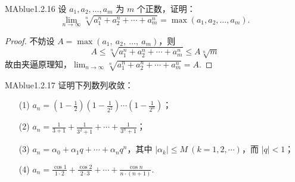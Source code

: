 \begin{problem}{MAblue}{1.2.16}
    设 $a_1, a_2, \ldots, a_m$ 为 $m$ 个正数，证明：
    \[
        \lim_{n \to \infty} \sqrt[n]{a_1^n + a_2^n + \cdots + a_m^n} = \max(a_1, a_2, \ldots, a_m).
    \]
\end{problem}

\begin{proof}
    不妨设 $A = \max( a_1,\ a_2,\ \ldots,\ a_m)$，则
    \[
        A \leqslant \sqrt[n]{a_1^n+a_2^n+\cdots+a_m^n} \leqslant A \sqrt[n] m
    \]
    故由夹逼原理知，$\lim_{n \to \infty} \sqrt[n]{a_1^n+a_2^n+\cdots+a_m^n} = A$.
\end{proof}

\begin{problem}{MAblue}{1.2.17}
    证明下列数列收敛：
    \begin{enumerate}
        \item[(1)]
        $a_n = \left( 1 - \frac 1 2 \right) \left( 1 - \frac 1 {2^2} \right) \cdots \left( 1 - \frac 1 {2^n} \right)$；
        \item[(2)]
        $a_n = \frac 1 {3+1} + \frac 1 {3^2 + 1} + \cdots + \frac 1 {3^n+1}$；
        \item[(3)]
        $a_n = \alpha_0 + \alpha_1 q + \cdots + \alpha_n q^n$，其中 $|\alpha_k| \leqslant M \ (k = 1, 2, \cdots)$，而 $|q| < 1$；
        \item[(4)]
        $a_n = \frac{\cos 1}{1 \cdot 2} + \frac{\cos 2}{2 \cdot 3} + \cdots + \frac{\cos n}{n \cdot (n+1)}$.
    \end{enumerate}
\end{problem}

